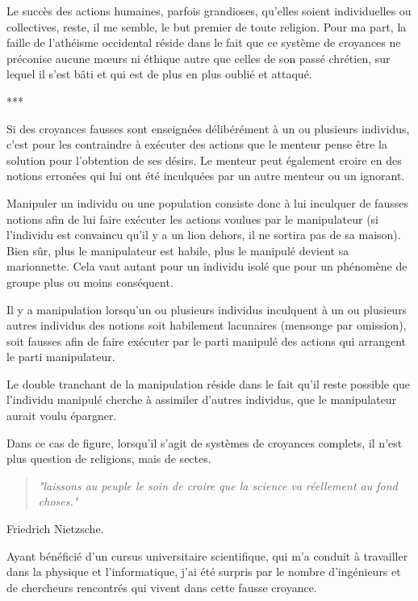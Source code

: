 Le succès des actions humaines, parfois grandioses, qu’elles soient individuelles ou collectives, reste, il me semble, le but premier de toute religion. Pour ma part, la faille de l'athéisme occidental réside dans le fait que ce système de croyances ne préconise aucune mœurs ni éthique autre que celles de son passé chrétien, sur lequel il s'est bâti et qui est de plus en plus oublié et attaqué.

\begin{center}
***
\end{center}

Si des croyances fausses sont enseignées délibérément à un ou plusieurs individus, c’est pour les contraindre à exécuter des actions que le menteur pense être la solution pour l'obtention de ses désirs. Le menteur peut également croire en des notions erronées qui lui ont été inculquées par un autre menteur ou un ignorant.

Manipuler un individu ou une population consiste donc à lui inculquer de fausses notions afin de lui faire exécuter les actions voulues par le manipulateur (si l’individu est convaincu qu’il y a un lion dehors, il ne sortira pas de sa maison). Bien sûr, plus le manipulateur est habile, plus le manipulé devient sa marionnette. Cela vaut autant pour un individu isolé que pour un phénomène de groupe plus ou moins conséquent.

Il y a manipulation lorsqu'un ou plusieurs individus inculquent à un ou plusieurs autres individus des notions soit habilement lacunaires (mensonge par omission), soit fausses afin de faire exécuter par le parti manipulé des actions qui arrangent le parti manipulateur.

Le double tranchant de la manipulation réside dans le fait qu'il reste possible que l'individu manipulé cherche à assimiler d'autres individus, que le manipulateur aurait voulu épargner.

Dans ce cas de figure, lorsqu'il s'agit de systèmes de croyances complets, il n'est plus question de religions, mais de sectes.


\begin{center}
\begin{quote}
\textit{"laissons au peuple le soin de croire que la science va réellement au fond choses."} \end{quote} Friedrich Nietzsche.
\end{center}

Ayant bénéficié d'un cursus universitaire scientifique, qui m'a conduit à travailler dans la physique et l'informatique, j'ai été surpris par le nombre d'ingénieurs et de chercheurs rencontrés qui vivent dans cette fausse croyance.

